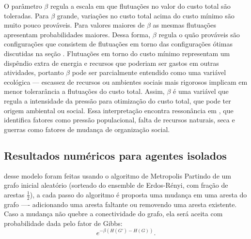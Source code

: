 O parâmetro $\beta$ regula a escala em que flutuações no valor do custo total são toleradas. Para $\beta$ grande, variações no custo total acima do custo mínimo são muito pouco prováveis. Para valores maiores de $\beta$ as mesmas flutuações apresentam probabilidades maiores. Dessa forma, $\beta$ regula o quão prováveis são configurações que consistem de flutuações em torno das configurações ótimas discutidas na seção \emph{}. Flutuações em torno do custo mínimo representam um dispêndio extra de energia e recursos que poderiam ser gastos em outras atividades, portanto $\beta$ pode ser parcialmente entendido como uma variável ecológica --- escassez de recursos ou ambientes sociais mais rigorosos implicam em menor tolerarância a flutuações do custo total. Assim, $\beta$ é uma variável que regula a intensidade da pressão para otimização do custo total, que pode ter origem ambiental ou social. Essa interpretação encontra ressonância em \citet{Earle1997}\cite{Earle1997}, que identifica fatores como pressão populacional, falta de recursos naturais, seca e guerras como fatores de mudança de organização social. 


\subsection{Resultados numéricos para agentes isolados}
 desse modelo foram feitas usando o algoritmo de Metropolis\cite{landau2005} Partindo de um grafo inicial aleatório (sorteado do ensemble de Erdos-Rényi, com fração de arestas $\frac{1}{2}$), a cada passo do algoritmo é proposta uma mudança em uma aresta do grafo ---- adicionando uma aresta faltante ou removendo uma aresta existente. Caso a mudança não quebre a conectividade do grafo, ela será aceita com probabilidade dada pelo fator de Gibbs: 
\begin{equation}
\label{eq:gibbsfactor}
e^{-\beta \left(H(G') - H(G)\right)}.
\end{equation}

